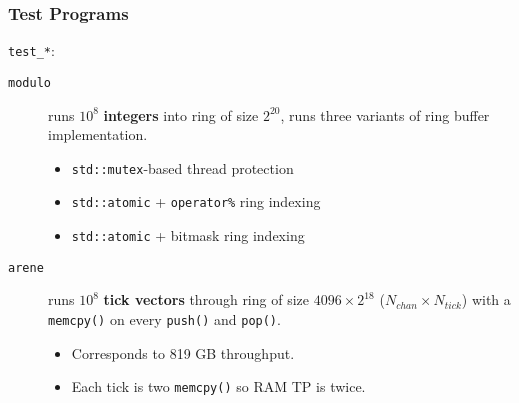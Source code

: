 \documentclass{beamer}
\begin{document}
\begin{frame}
  \frametitle{Test Programs}
  \texttt{test\_*}:
  \begin{description}
  \item[\texttt{modulo}] runs $10^8$ \textbf{integers} into ring of
    size $2^{20}$, runs three variants of ring buffer implementation.
    \begin{itemize}
    \item \texttt{std::mutex}-based thread protection
    \item \texttt{std::atomic} + \texttt{operator\%} ring indexing
    \item \texttt{std::atomic} + bitmask ring indexing
    \end{itemize}
  \item[\texttt{arene}] runs $10^8$ \textbf{tick vectors} through ring
    of size $4096 \times 2^{18}$ ($N_{chan} \times N_{tick}$) with a
    \texttt{memcpy()} on every \texttt{push()} and \texttt{pop()}.
    \begin{itemize}
    \item Corresponds to 819 GB throughput.
    \item Each tick is two \texttt{memcpy()} so RAM TP is twice.
    \end{itemize}
  \end{description}
\end{frame}
\end{document}
